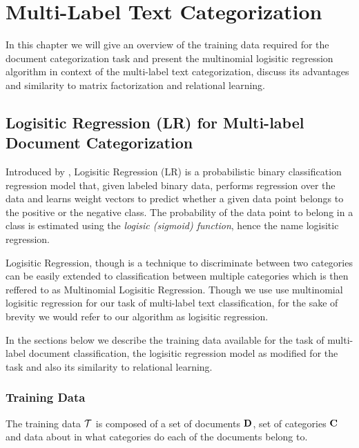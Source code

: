\chapter{Multi-Label Text Categorization}
\label{chapter:mltextcat}


In this chapter we will give an overview of the training data required for the document categorization task and present the multinomial logisitic regression algorithm in context of the multi-label text categorization, discuss its advantages and similarity to matrix factorization and relational learning.

\section{Logisitic Regression (LR) for Multi-label Document Categorization}
\label{sec:lrtc}
Introduced by \citep{hosmer1989applied}, Logisitic Regression (LR) is a probabilistic binary classification regression model that, given labeled binary data, performs regression over the data and learns weight vectors to predict whether a given data point belongs to the positive or the negative class. 
The probability of the data point to belong in a class is estimated using the \emph{logisic (sigmoid) function}, hence the name logisitic regression.

Logisitic Regression, though is a technique to discriminate between two categories can be easily extended to classification between multiple categories which is then reffered to as Multinomial Logisitic Regression. 
Though we use use multinomial logisitic regression for our task of multi-label text classification, for the sake of brevity we would refer to our algorithm as logisitic regression.\

In the sections below we describe the training data available for the task of multi-label document classification, the logisitic regression model as modified for the task and also its similarity to relational learning.

\subsection{Training Data}
The training data $\mathcal{T}$ is composed of a set of documents $\mathbf{D}$, set of categories $\mathbf{C}$ and data about in what categories do each of the documents belong to. 

